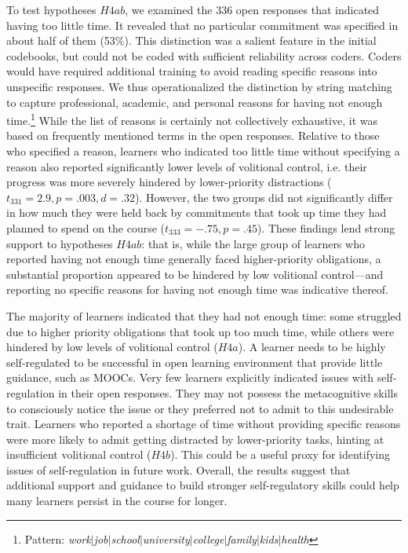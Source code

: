 \documentclass{sigchi}\usepackage[]{graphicx}\usepackage[]{color}
\begin{document}
To test hypotheses $H4ab$, we examined the 336 open responses that indicated having too little time. It revealed that no particular commitment was specified in about half of them (53\%). This distinction was a salient feature in the initial codebooks, but could not be coded with sufficient reliability across coders. Coders would have required additional training to avoid reading specific reasons into unspecific responses. We thus operationalized the distinction by string matching to capture professional, academic, and personal reasons for having not enough time.\footnote{Pattern: {\em work$|$job$|$school$|$university$|$college$|$family$|$kids$|$health}} While the list of reasons is certainly not collectively exhaustive, it was based on frequently mentioned terms in the open responses. Relative to those who specified a reason, learners who indicated too little time without specifying a reason also reported significantly lower levels of volitional control, i.e. their progress was more severely hindered by lower-priority distractions ($t_{331}=2.9, p=.003, d=.32$). However, the two groups did not significantly differ in how much they were held back by commitments that took up time they had planned to spend on the course ($t_{333}=-.75, p=.45$). These findings lend strong support to hypotheses $H4ab$: that is, while the large group of learners who reported having not enough time generally faced higher-priority obligations, a substantial proportion appeared to be hindered by low volitional control---and reporting no specific reasons for having not enough time was indicative thereof. 

The majority of learners indicated that they had not enough time: some struggled due to higher priority obligations that took up too much time, while others were hindered by low levels of volitional control ($H4a$). A learner needs to be highly self-regulated to be successful in open learning environment that provide little guidance, such as MOOCs. Very few learners explicitly indicated issues with self-regulation in their open responses. They may not possess the metacognitive skills to consciously notice the issue or they preferred not to admit to this undesirable trait. Learners who reported a shortage of time without providing specific reasons were more likely to admit getting distracted by lower-priority tasks, hinting at insufficient volitional control ($H4b$). This could be a useful proxy for identifying issues of self-regulation in future work. Overall, the results suggest that additional support and guidance to build stronger self-regulatory skills could help many learners persist in the course for longer.
\end{document}

